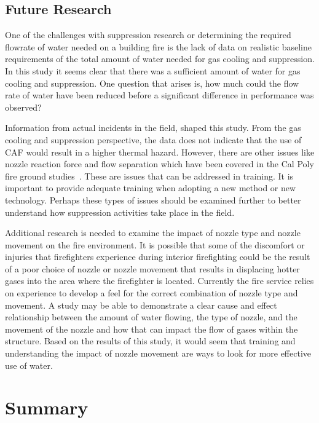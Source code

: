 \documentclass[12pt,oneside]{book}
\begin{document}
\section{Future Research}

One of the challenges with suppression research or determining the required flowrate of water needed on a building fire is the lack of data on realistic baseline requirements of the total amount of water needed for gas cooling and suppression. In this study it seems clear that there was a sufficient amount of water for gas cooling and suppression. One question that arises is, how much could the flow rate of water have been reduced before a significant difference in performance was observed? 

Information from actual incidents in the field, shaped this study. From the gas cooling and suppression perspective, the data does not indicate that the use of CAF would result in a higher thermal hazard. However, there are other issues like nozzle reaction force and flow separation which have been covered in the Cal Poly fire ground studies~\cite{Carracino:2013,Dicus:2013,LaPolla:2012}. These are issues that can be addressed in training. It is important to provide adequate training when adopting a new method or new technology. Perhaps these types of issues should be examined further to better understand how suppression activities take place in the field.

Additional research is needed to examine the impact of nozzle type and nozzle movement on the fire environment. It is possible that some of the discomfort or injuries that firefighters experience during interior firefighting could be the result of a poor choice of nozzle or nozzle movement that results in displacing hotter gases into the area where the firefighter is located. Currently the fire service relies on experience to develop a feel for the correct combination of nozzle type and movement. A study may be able to demonstrate a clear cause and effect relationship between the amount of water flowing, the type of nozzle, and the movement of the nozzle and how that can impact the flow of gases within the structure. Based on the results of this study, it would seem that training and understanding the impact of nozzle movement are ways to look for more effective use of water. 

\chapter{Summary}
\label{chap:Summary}
\end{document}
